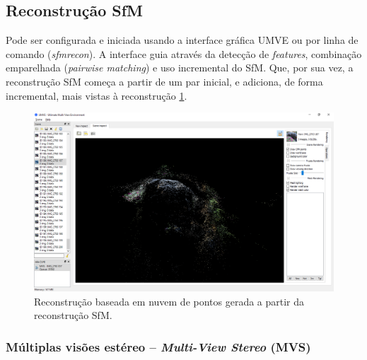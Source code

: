 \subsection*{Reconstrução SfM}

Pode ser configurada e iniciada usando a interface gráfica UMVE ou por linha de comando (\emph{sfmrecon}). A interface guia através da detecção de \emph{features}, combinação emparelhada (\emph{pairwise matching}) e uso incremental do SfM. Que, por sua vez, a reconstrução SfM começa a partir de um par inicial, e adiciona, de forma incremental, mais vistas à reconstrução \ref{fig:mvesfm}.

\begin{figure}[!h]
	\centering
	\includegraphics[width=0.7\linewidth]{figs/umve5sfm.png}
	\caption{%
	Reconstrução baseada em nuvem de pontos gerada a partir da reconstrução SfM.%
	}\label{fig:mvesfm}
\end{figure}


%
\subsubsection*{Múltiplas visões estéreo -- \emph{Multi-View Stereo} (MVS)}

